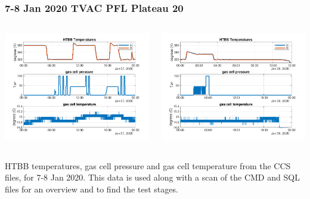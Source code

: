 \documentclass[10pt]{beamer}
\begin{document}
\begin{frame}
\frametitle{7-8 Jan 2020 TVAC PFL Plateau 20}
\begin{columns}[t]
\begin{column}{0.5\textwidth}
  \begin{centering}
  \includegraphics[width=\textwidth]{harvest_01-07/css_summary_07_jan.png}
  \end{centering}\vspace{3mm}

\end{column}
\begin{column}{0.5\textwidth}  
  \begin{centering}
  \includegraphics[width=\textwidth]{harvest_01-07/css_summary_08_jan.png}
  \end{centering}\vspace{3mm}

\end{column}
\end{columns}

HTBB temperatures, gas cell pressure and gas cell temperature from
the CCS files, for 7-8 Jan 2020.  This data is used along with a
scan of the CMD and SQL files for an overview and to find the test
stages.

\end{frame}
\end{document}
